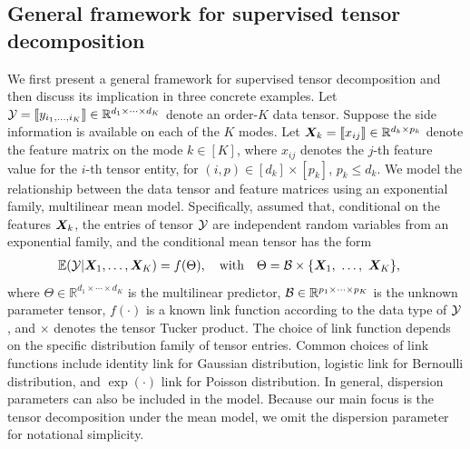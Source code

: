 \documentclass[12pt]{article}
\theoremstyle{plain}
\theoremstyle{definition}
\begin{document}
\subsection{General framework for supervised tensor decomposition}
We first present a general framework for supervised tensor decomposition and then discuss its implication in three concrete examples. Let $\mathcal{Y}=\llbracket y_{i_1,\ldots,i_K} \rrbracket\in\mathbb{R}^{d_1\times \cdots\times d_K}$ denote an order-$K$ data tensor. Suppose the side information is available on each of the $K$ modes. Let $\bm X_k=\llbracket x_{ij} \rrbracket\in\mathbb{R}^{d_k\times p_k}$ denote the feature matrix on the mode $k\in[K]$, where $x_{ij}$ denotes the $j$-th feature value for the $i$-th tensor entity, for $(i,p)\in[d_k]\times[p_k]$, $p_k\leq d_k$. We model the relationship between the data tensor and feature matrices using an exponential family, multilinear mean model. Specifically, assumed that, conditional on the features $\bm X_k$, the entries of tensor $\mathcal{Y}$ are independent random variables from an exponential family, and the conditional mean tensor has the form
\begin{align}\label{eq:tensormodel}
&\mathbb{E}(\mathcal{Y}|\bm X_1,\ldots,\bm X_K)=f(\Theta),\quad \text{with}\quad \Theta =\mathcal{B}\times\{\bm X_1,\ \ldots,\ \bm X_K\} ,
\end{align}
where $\Theta\in\mathbb{R}^{d_1\times \cdots\times d_K}$ is the multilinear predictor, $\mathcal{B}\in\mathbb{R}^{p_1\times \cdots \times p_K}$ is the unknown parameter tensor, $f(\cdot)$ is a known link function according to the data type of $\mathcal{Y}$, and $\times$ denotes the tensor Tucker product. The choice of link function depends on the specific distribution family of tensor entries. Common choices of link functions include identity link for Gaussian distribution, logistic link for Bernoulli distribution, and $\exp(\cdot)$ link for Poisson distribution. In general, dispersion parameters can also be included in the model. Because our main focus is the tensor decomposition under the mean model, we omit the dispersion parameter for notational simplicity. 
\end{document}
